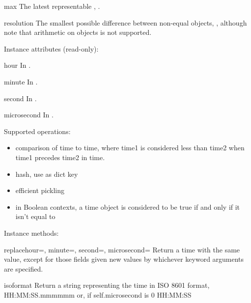 \begin{memberdesc}{max}
        The latest representable , .
\end{memberdesc}

\begin{memberdesc}{resolution}
        The smallest possible difference between non-equal 
        objects, , although note that
        arithmetic on  objects is not supported.
\end{memberdesc}

Instance attributes (read-only):

\begin{memberdesc}{hour}
In .
\end{memberdesc}
\begin{memberdesc}{minute}
In .
\end{memberdesc}
\begin{memberdesc}{second}
In .
\end{memberdesc}
\begin{memberdesc}{microsecond}
In .
\end{memberdesc}

Supported operations:

\begin{itemize}
  \item
    comparison of time to time, where time1 is considered
    less than time2 when time1 precedes time2 in time.

  \item
    hash, use as dict key

  \item
    efficient pickling

  \item
    in Boolean contexts, a time object is considered to be true
    if and only if it isn't equal to 
\end{itemize}

Instance methods:

\begin{methoddesc}{replace}{hour=, minute=, second=, microsecond=}
    Return a time with the same value, except for those fields given
    new values by whichever keyword arguments are specified.
\end{methoddesc}

\begin{methoddesc}{isoformat}{}
    Return a string representing the time in ISO 8601 format,
        HH:MM:SS.mmmmmm
    or, if self.microsecond is 0
        HH:MM:SS
\end{methoddesc}

